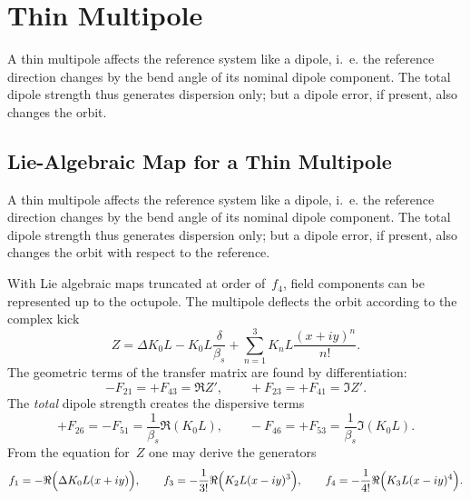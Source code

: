  
\section{Thin Multipole}
\label{multipole}
A thin multipole affects the reference system like a dipole,
i.~e. the reference direction changes by the bend angle of its
nominal dipole component.
The total dipole strength thus generates dispersion only;
but a dipole error, if present, also changes the orbit.
 
\subsection{Lie-Algebraic Map for a Thin Multipole}
A thin multipole affects the reference system like a dipole,
i.~e. the reference direction changes by the bend angle of its
nominal dipole component.
The total dipole strength thus generates dispersion only;
but a dipole error, if present, also changes the orbit with respect to
the reference.
 
With Lie algebraic maps truncated at order of~$f_4$,
field components can be represented up to the octupole.
The multipole deflects the orbit according to the complex kick
\begin{equation}
Z = \Delta K_0 L - K_0 L \frac{\delta}{\beta_s}
  + \sum_{n=1}^3 K_n L \frac{(x + i y)^n}{n!}.
\end{equation}
The geometric terms of the transfer matrix are found by differentiation:
\begin{equation}
-F_{21}=+F_{43}=\Re Z', \qquad +F_{23}=+F_{41}=\Im Z'.
\end{equation}
The {\em total} dipole strength creates the dispersive terms
\begin{equation}
+F_{26}=-F_{51}=\frac{1}{\beta_s}\Re(K_0 L), \qquad
-F_{46}=+F_{53}=\frac{1}{\beta_s}\Im(K_0 L).
\end{equation}
From the equation for~$Z$ one may derive the generators
\begin{equation}
f_1=-\Re\Bigl(\Delta K_0 L (x + iy) \Bigr), \qquad
f_3=-\frac{1}{3!}\Re\Bigl(K_2 L (x - iy)^3 \Bigr), \qquad
f_4=-\frac{1}{4!}\Re\Bigl(K_3 L (x - iy)^4 \Bigr).
\end{equation}
 
